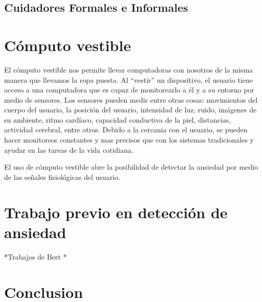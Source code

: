 \subsection{Cuidadores Formales e Informales}\label{secc:caregivers}
\section{C\'omputo vestible}\label{secc:dementia}
El c\'omputo vestible nos permite llevar computadoras con nosotros de la misma manera que llevamos la ropa puesta. Al ``vestir'' un dispositivo, el usuario tiene acceso a una computadora que es capaz de monitorearlo a \'el y a su entorno por medio de sensores. Los sensores pueden medir entre otras cosas: movimientos del cuerpo del usuario, la posici\'on del usuario, intensidad de luz, ruido, im\'agenes de su ambiente, ritmo card\'iaco, capacidad conductiva de la piel, distancias, actividad cerebral, entre otros. Debido a la cercania con el usuario, se pueden hacer monitoreos constantes y mas precisos que con los sistemas tradicionales y ayudar en las tareas de la vida cotidiana.

El uso de c\'omputo vestible abre la posibilidad de detectar la ansiedad por medio de las se\~nales fisiol\'ogicas del usuario.

\section{Trabajo previo en detecci\'on de ansiedad}

*Trabajos de Bert
*
\section{Conclusion}\label{secc:conclution}



\newpage
